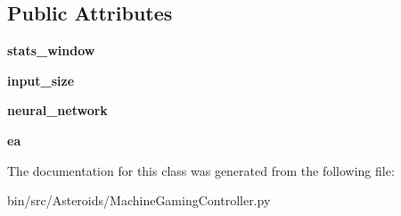 \subsection*{Public Attributes}
\begin{DoxyCompactItemize}
\item 
{\bfseries stats\+\_\+window}\hypertarget{classMachineGamingController_1_1MachineGamingController_a5c7fa65b5ff61ced3e53b6a75be9b447}{}\label{classMachineGamingController_1_1MachineGamingController_a5c7fa65b5ff61ced3e53b6a75be9b447}

\item 
{\bfseries input\+\_\+size}\hypertarget{classMachineGamingController_1_1MachineGamingController_a5d895aaebf825121920b865c58f1e4a4}{}\label{classMachineGamingController_1_1MachineGamingController_a5d895aaebf825121920b865c58f1e4a4}

\item 
{\bfseries neural\+\_\+network}\hypertarget{classMachineGamingController_1_1MachineGamingController_a3976256fc7d27ebe7d28ec536911d62e}{}\label{classMachineGamingController_1_1MachineGamingController_a3976256fc7d27ebe7d28ec536911d62e}

\item 
{\bfseries ea}\hypertarget{classMachineGamingController_1_1MachineGamingController_afa9b244a5044affb82da318a3334d380}{}\label{classMachineGamingController_1_1MachineGamingController_afa9b244a5044affb82da318a3334d380}

\end{DoxyCompactItemize}


The documentation for this class was generated from the following file\+:\begin{DoxyCompactItemize}
\item 
bin/src/\+Asteroids/Machine\+Gaming\+Controller.\+py\end{DoxyCompactItemize}
